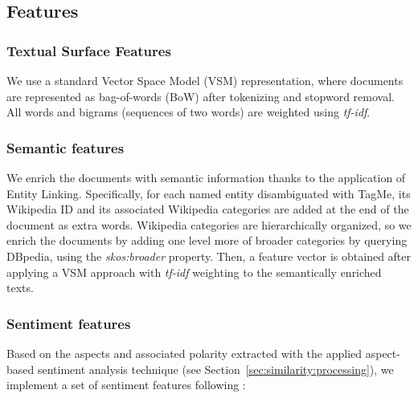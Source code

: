 \subsection{Features}
\label{sec:similarity:features}
\subsubsection{Textual Surface Features}
We use a standard Vector Space Model (VSM) representation, where documents are represented as bag-of-words (BoW) after tokenizing and stopword removal. All words and bigrams (sequences of two words) are weighted using \textit{tf-idf}. 

\subsubsection{Semantic features}

We enrich the documents with semantic information thanks to the application of Entity Linking. Specifically, for each named entity disambiguated with TagMe, its Wikipedia ID and its associated Wikipedia categories are added at the end of the document as extra words. Wikipedia categories are hierarchically organized, so we enrich the documents by adding one level more of broader categories by querying DBpedia, using the \textit{skos:broader} property.
Then, a feature vector is obtained after applying a VSM approach with \textit{tf-idf} weighting to the semantically enriched texts.


\subsubsection{Sentiment features} 

Based on the aspects and associated polarity extracted with the applied aspect-based sentiment analysis technique (see Section~\ref{sec:similarity:processing}), we implement a set of sentiment features following \cite{Suero2014}:

